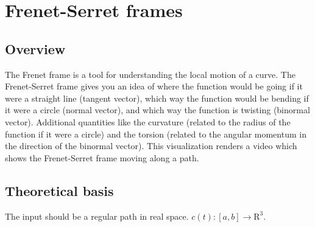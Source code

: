 \section{Frenet-Serret frames}

\subsection*{Overview}

The Frenet frame is a tool for understanding the local motion of a curve. The Frenet-Serret frame gives you an idea of where the function would be going if it were a straight line (tangent vector), which way the function would be bending if it were a circle (normal vector), and which way the function is twisting (binormal vector). Additional quantities like the curvature (related to the radius of the function if it were a circle) and the torsion (related to the angular momentum in the direction of the binormal vector). This visualization renders a video which shows the Frenet-Serret frame moving along a path. \cite{frenet1} \cite{frenet2} \cite{frenet3}

\subsection*{Theoretical basis}

The input should be a regular path in real space. \(c(t) : [a, b] \to \mathrm R^3\).

